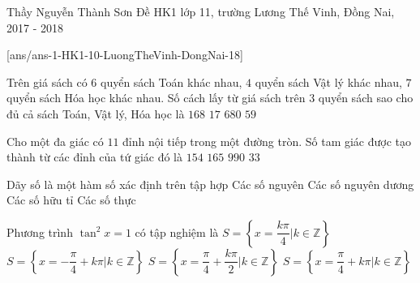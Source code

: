 \begin{name}
{Thầy Nguyễn Thành Sơn}
{Đề HK1 lớp 11, trường Lương Thế Vinh, Đồng Nai, 2017 - 2018}
\end{name}
\setcounter{ex}{0}\setcounter{bt}{0}
[ans/ans-1-HK1-10-LuongTheVinh-DongNai-18]
\begin{ex}%
Trên giá sách có $6$ quyển sách Toán khác nhau, $4$ quyển sách Vật lý khác nhau, $7$ quyển sách Hóa học khác nhau. Số cách lấy từ giá sách trên $3$ quyển sách sao cho đủ cả sách Toán, Vật lý, Hóa học là
	\choice
	{\True $168$}
	{$17$}
	{$680$}
	{$59$}
\end{ex}
\begin{ex}%
Cho một đa giác có $11$ đỉnh nội tiếp trong một đường tròn. Số tam giác được tạo thành từ các đỉnh của tứ giác đó là
	\choice
	{$154$}
	{\True $165$}
	{$990$}
	{$33$}
\end{ex}
\begin{ex}%
	Dãy số là một hàm số xác định trên tập hợp
	\choice
	{Các số nguyên}
	{\True Các số nguyên dương}
	{Các số hữu tỉ}
	{Các số thực}
\end{ex}
\begin{ex}%
	Phương trình $\tan^2x=1$ có tập nghiệm là
	\choice
	{$S=\left\{x=\dfrac{k\pi}{4}\bigg|k\in \mathbb{Z}\right\}$}
	{$S=\left\{x=-\dfrac{\pi}{4}+k\pi \bigg|k\in \mathbb{Z}\right\}$}
	{\True $S=\left\{x=\dfrac{\pi}{4}+\dfrac{k\pi}{2}\bigg|k\in \mathbb{Z}\right\}$}
	{$S=\left\{x=\dfrac{\pi}{4}+k\pi \bigg|k\in \mathbb{Z}\right\}$}
\loigiai{
Ta có $\tan^2x=1 \Leftrightarrow \left[\begin{aligned}& \tan x=1 \\ & \tan x=-1 \end{aligned}\right. \Leftrightarrow \left[\begin{aligned}& x=\dfrac{\pi}{4}+k\pi \\ & x=-\dfrac{\pi}{4}+k\pi \end{aligned}\right. \Leftrightarrow x=\dfrac{\pi}{4}+\dfrac{k\pi}{2} \left(k\in \mathbb{Z}\right)$}
\end{ex}
